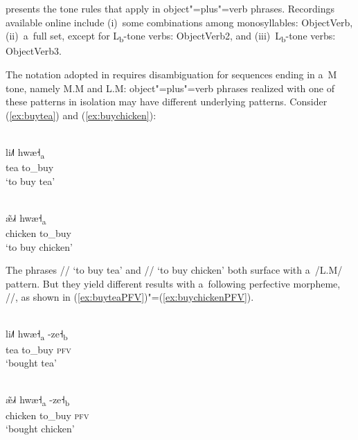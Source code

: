  presents the tone rules that apply in object"=plus"=verb phrases. Recordings
available online include (i)~some combinations among monosyllables: ObjectVerb, (ii)~a~full set,
except for L\textsubscript{b}-tone verbs: ObjectVerb2, and (iii)~L\textsubscript{b}-tone verbs: ObjectVerb3. 

The notation adopted in  requires disambiguation for sequences ending in a~M tone, namely
M.M and L.M: object"=plus"=verb phrases realized with one of these patterns in isolation may have
different underlying patterns. Consider (\ref{ex:buytea}) and (\ref{ex:buychicken}): 

\begin{exe}
	\ex
	\label{ex:buytea}
	\\
	\gll li˩˥	hwæ˧\textsubscript{a}\\
	tea		to\_buy\\
	\glt ‘to buy tea’
\end{exe}

\begin{exe}
	\ex
	\label{ex:buychicken}
	\\
	\gll æ̃˩˧	hwæ˧\textsubscript{a}\\
	chicken		to\_buy\\
	\glt ‘to buy chicken’
\end{exe}

The phrases // ‘to buy tea’ and // ‘to
buy chicken’ both surface with a~/L.M/ pattern. But they yield different results with a~following {perfective} morpheme, //, as shown in (\ref{ex:buyteaPFV})"=(\ref{ex:buychickenPFV}).

\begin{exe}
	\ex
	\label{ex:buyteaPFV}
	\\
	\gll li˩˥	hwæ˧\textsubscript{a}		-ze˧\textsubscript{b}\\
	tea		to\_buy		\textsc{pfv}\\
	\glt ‘bought tea’
\end{exe}

\begin{exe}
	\ex
	\label{ex:buychickenPFV}
	\\
	\gll æ̃˩˧	hwæ˧\textsubscript{a}		-ze˧\textsubscript{b}\\
	chicken		to\_buy		\textsc{pfv}\\
	\glt ‘bought chicken’
\end{exe}


